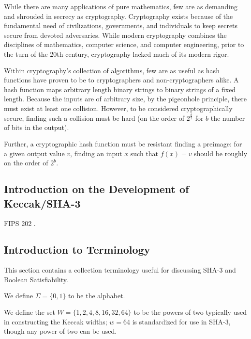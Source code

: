 \documentclass[10pt,twocolumn,twoside]{pnas-new}
\begin{document}
    While there are many applications of pure mathematics, few are as
demanding and shrouded in secrecy as cryptography. Cryptography exists
because of the fundamental need of civilizations, governments, and individuals
to keep secrets secure from devoted adversaries. While modern cryptography
combines the disciplines of mathematics, computer science, and computer
engineering, prior to the turn of the 20th century, cryptography lacked much
of its modern rigor.

    Within cryptography's collection of algorithms, few are as useful as
hash functions have proven to be to cryptographers and non-cryptographers
alike. A hash function maps arbitrary length binary strings to binary strings
of a fixed length. Because the inputs are of arbitrary size, by the pigeonhole
principle, there must exist at least one collision. However, to be considered
cryptographically secure, finding such a collision must be hard (on the order
of $2^{\frac{b}{2}}$ for $b$ the number of bits in the output).

    Further, a cryptographic hash function must be resistant finding a
preimage: for a given output value $v$, finding an input $x$ such that
$f(x) = v$ should be roughly on the order of $2^{b}$.


\subsection{Introduction on the Development of Keccak/SHA-3} \label{sec:i:keccak}

    FIPS 202 \cite{NIST202}.



\subsection{Introduction to Terminology} \label{sec:i:terminology}

This section contains a collection terminology useful for discussing SHA-3
and Boolean Satisfiability.

We define $\Sigma = \{0, 1\}$ to be the alphabet.

We define the set $W = \{1, 2, 4, 8, 16, 32, 64\}$ to be the powers of two
typically used in constructing the Keccak widths; $w=64$ is standardized for
use in SHA-3, though any power of two can be used.
\end{document}
